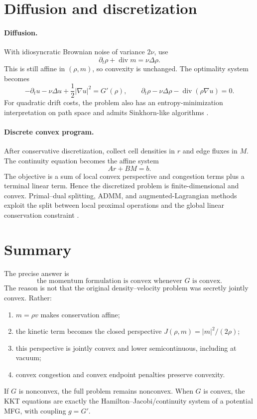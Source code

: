 \documentclass[11pt,a4paper]{article}
\theoremstyle{definition}
\newcommand{\diverg}{\operatorname{div}}
\newcommand{\abs}[1]{\left\lvert#1\right\rvert}
\begin{document}
\section{Diffusion and discretization}

\paragraph{Diffusion.}
With idiosyncratic Brownian noise of variance \(2\nu\), use
\[
  \partial_t\rho+\diverg m=\nu\Delta\rho.
\]
This is still affine in \((\rho,m)\), so convexity is unchanged. The
optimality system becomes
\[
  -\partial_tu-\nu\Delta u+\frac12\abs{\nabla u}^2=G'(\rho),
  \qquad
  \partial_t\rho-\nu\Delta\rho-\diverg(\rho\nabla u)=0.
\]
For quadratic drift costs, the problem also has an entropy-minimization
interpretation on path space and admits Sinkhorn-like algorithms
\citep{BenamouCarlierDiMarinoNenna2019}.

\paragraph{Discrete convex program.}
After conservative discretization, collect cell densities in \(r\) and edge
fluxes in \(M\). The continuity equation becomes the affine system
\[
  Ar+BM=b.
\]
The objective is a sum of local convex perspective and congestion terms plus
a terminal linear term. Hence the discretized problem is finite-dimensional
and convex. Primal--dual splitting, ADMM, and augmented-Lagrangian methods
exploit the split between local proximal operations and the global linear
conservation constraint \citep{BenamouCarlier2015,AchdouLauriere2020}.

\section{Summary}

The precise answer is
\[
  \boxed{\text{the momentum formulation is convex whenever \(G\) is convex.}}
\]
The reason is not that the original density--velocity problem was secretly
jointly convex. Rather:
\begin{enumerate}[leftmargin=2em]
  \item \(m=\rho v\) makes conservation affine;
  \item the kinetic term becomes the closed perspective
  \(J(\rho,m)=|m|^2/(2\rho)\);
  \item this perspective is jointly convex and lower semicontinuous, including
  at vacuum;
  \item convex congestion and convex endpoint penalties preserve convexity.
\end{enumerate}
If \(G\) is nonconvex, the full problem remains nonconvex. When \(G\) is
convex, the KKT equations are exactly the Hamilton--Jacobi/continuity system
of a potential MFG, with coupling \(g=G'\).



\end{document}
